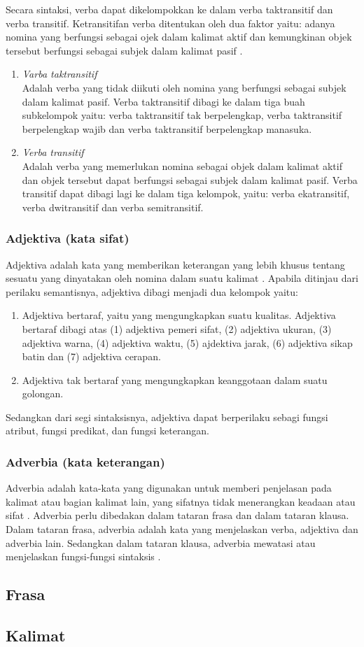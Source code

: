 Secara sintaksi, verba dapat dikelompokkan ke dalam verba taktransitif dan verba transitif. Ketransitifan verba ditentukan oleh dua faktor yaitu: adanya nomina yang berfungsi sebagai ojek dalam kalimat aktif dan kemungkinan objek tersebut berfungsi sebagai subjek dalam kalimat pasif \citep{alwi}.
\begin{enumerate}
	\item \emph{Varba taktransitif}\\
	Adalah verba yang tidak diikuti oleh nomina yang berfungsi sebagai subjek dalam kalimat pasif. Verba taktransitif dibagi ke dalam tiga buah subkelompok yaitu: verba taktransitif tak berpelengkap, verba taktransitif berpelengkap wajib dan verba taktransitif berpelengkap manasuka.
	\item \emph{Verba transitif}\\
	Adalah verba yang memerlukan nomina sebagai objek dalam kalimat aktif dan objek tersebut dapat berfungsi sebagai subjek dalam kalimat pasif. Verba transitif dapat dibagi lagi ke dalam tiga kelompok, yaitu: verba ekatransitif, verba dwitransitif dan verba semitransitif.
\end{enumerate}

\subsubsection{Adjektiva (kata sifat)}
Adjektiva adalah kata yang memberikan keterangan yang lebih khusus tentang sesuatu yang  dinyatakan oleh nomina dalam suatu kalimat \citep{alwi}. Apabila ditinjau dari perilaku semantisnya, adjektiva dibagi menjadi dua kelompok yaitu:
\begin{enumerate}
	\item Adjektiva bertaraf, yaitu yang mengungkapkan suatu kualitas. Adjektiva bertaraf dibagi atas (1) adjektiva pemeri sifat, (2) adjektiva ukuran, (3) adjektiva warna, (4) adjektiva waktu, (5) ajdektiva jarak, (6) adjektiva sikap batin dan (7) adjektiva cerapan.
	\item Adjektiva tak bertaraf yang mengungkapkan keanggotaan dalam suatu golongan.
\end{enumerate}
Sedangkan dari segi sintaksisnya, adjektiva dapat berperilaku sebagi fungsi atribut, fungsi predikat, dan fungsi keterangan.

\subsubsection{Adverbia (kata keterangan)}
Adverbia adalah kata-kata yang digunakan untuk memberi penjelasan pada kalimat atau bagian kalimat lain, yang sifatnya tidak menerangkan keadaan atau sifat \citep{chaer}. Adverbia perlu dibedakan dalam tataran frasa dan dalam tataran klausa. Dalam tataran frasa, adverbia adalah kata yang menjelaskan verba, adjektiva dan adverbia lain. Sedangkan dalam tataran klausa, adverbia mewatasi atau menjelaskan fungsi-fungsi sintaksis \citep{alwi}.

\subsection{Frasa}
\subsection{Kalimat}
